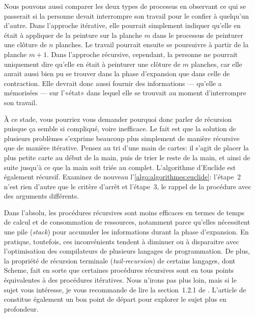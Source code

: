 Nous pouvons aussi comparer les deux types de processus en observant
ce qui se passerait si la personne devait interrompre son travail pour
le confier à quelqu'un d'autre. Dans l'approche itérative, elle
pourrait simplement indiquer qu'elle en était à appliquer de la
peinture sur la planche $m$ dans le processus de peinturer une clôture
de $n$ planches. Le travail pourrait ensuite se poursuivre à partir de
la planche $m + 1$. Dans l'approche récursive, cependant, la personne
ne pourrait uniquement dire qu'elle en était à peinturer une clôture
de $m$ planches, car elle aurait aussi bien pu se trouver dans la
phase d'expansion que dans celle de contraction. Elle devrait donc
aussi fournir des informations --- qu'elle a mémorisées --- sur
l'«état» dans lequel elle se trouvait au moment d'interrompre son
travail.

À ce stade, vous pourriez vous demander pourquoi donc parler de
récursion puisque ça semble si compliqué,
voire inefficace. Le fait est que la solution de plusieurs problèmes
s'exprime beaucoup plus simplement de manière récursive que de manière
itérative. Pensez au tri d'une main de cartes: il s'agit de placer la
plus petite carte au début de la main, puis de trier le reste de la
main, et ainsi de suite jusqu'à ce que la main soit triée au complet.
L'algorithme d'Euclide est
également récursif. Examinez de nouveau
l'\autoref{algo:algorithmes:euclide}: l'étape~2 n'est rien d'autre que
le critère d'arrêt et l'étape~3, le rappel de la procédure avec des
arguments différents.

Dans l'absolu, les procédures récursives sont moins efficaces en
termes de temps de calcul et de consommation de ressources, notamment
parce qu'elles nécessitent une pile (\emph{stack}) pour
accumuler les informations durant la phase d'expansion. En pratique,
toutefois, ces inconvénients tendent à diminuer ou à disparaitre avec
l'optimisation des compilateurs de plusieurs langages de programmation.
De plus, la propriété de
récursion terminale
(\emph{tail-recursion}) de certains langages, dont
Scheme, fait en sorte que certaines procédures
récursives sont en tous points équivalentes à des procédures
itératives. Nous n'irons pas plus loin, mais si le sujet vous
intéresse, je vous recommande de lire la section~1.2.1 de
\citet{Sussman:scheme:1996}. L'article de
\citet{Wikipedia:Recursion_terminale} constitue également un bon point
de départ pour explorer le sujet plus en profondeur.


